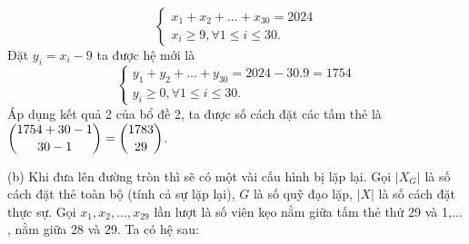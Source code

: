 \documentclass[11pt]{scrartcl}
\begin{document}
\begin{itemize}[label=, leftmargin=0em, itemsep=0.5em]
\begin{sol}
        \[
            \left\{
            \begin{array}{l}
                    x_1 + x_2 + \dots + x_{30} = 2024\\
                    x_i \geq 9, \forall 1 \leq i \leq 30.
            \end{array}
            \right.
        \]
        Đặt $y_i = x_i - 9$ ta được hệ mới là 
        \[
            \left\{
            \begin{array}{l}
                    y_1 + y_2 + \dots + y_{30} = 2024 - 30.9 = 1754\\
                    y_i \geq 0, \forall 1 \leq i \leq 30.
            \end{array}
            \right.
        \]
        Áp dụng kết quả 2 của bổ đề 2, ta được số cách đặt các tấm thẻ là $\displaystyle\binom{1754 + 30 - 1}{30 - 1} = \displaystyle\binom{1783}{29}$.

        (b) Khi đưa lên đường tròn thì sẽ có một vài cấu hình bị lặp lại. Gọi $|X_G|$ là số cách đặt thẻ toàn bộ (tính cả sự lặp lại), $G$ là số quỹ đạo lặp, $|X|$ là số cách đặt thực sự. Gọi $x_1,x_2,\dots,x_{29}$ lần lượt là số viên kẹo nằm giữa tấm thẻ thứ 29 và 1,$\dots$, nằm giữa 28 và 29. Ta có hệ sau:


\end{sol}
\end{itemize}
\end{document}
